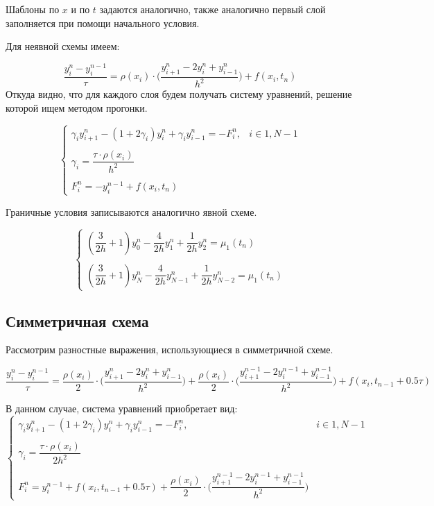 \documentclass[12pt]{article}
\begin{document}
Шаблоны по $x$ и по $t$ задаются аналогично, также аналогично первый слой заполняется при помощи начального условия.

Для неявной схемы имеем:

$$
\dfrac{y_i^n - y_i^{n-1}}{\tau} = \rho(x_i) \cdot \bigg(\dfrac{y_{i+1}^n - 2y_i^n + y_{i-1}^n}{h^2} \bigg) + f(x_i, t_n)
$$
Откуда видно, что для каждого слоя будем получать систему уравнений, решение которой ищем методом прогонки.

$$
\begin{cases}
\gamma_i y_{i+1}^n -(1 + 2\gamma_i) y_i^n + \gamma_i y_{i-1}^n = -F_i^n, & i \in {1, N-1} \\ \\
\gamma_i = \dfrac{\tau \cdot \rho(x_i)}{h^2} \\ \\
F_i^n = -y_i^{n-1} + f(x_i, t_n)
\end{cases}
$$

Граничные условия записываются аналогично явной схеме.

$$
\begin{cases}
(\dfrac{3}{2h} + 1)y_0^n - \dfrac{4}{2h}y_1^n + \dfrac{1}{2h}y_2^n = \mu_1(t_n) \\ \\
(\dfrac{3}{2h} + 1)y_N^n - \dfrac{4}{2h}y_{N-1}^n + \dfrac{1}{2h}y_{N-2}^n = \mu_1(t_n)
\end{cases} 
$$

\newpage
\subsection{Симметричная схема}

Рассмотрим разностные выражения, использующиеся в симметричной схеме.

$$
\dfrac{y_i^n - y_i^{n-1}}{\tau} = \dfrac{\rho(x_i)}{2} \cdot \bigg(\dfrac{y_{i+1}^n - 2y_i^n + y_{i-1}^n}{h^2} \bigg) + \dfrac{\rho(x_i)}{2} \cdot \bigg(\dfrac{y_{i+1}^{n-1}- 2y_i^{n-1} + y_{i-1}^{n-1}}{h^2} \bigg) + f(x_i, t_{n-1} + 0.5\tau)
$$

В данном случае, система уравнений приобретает вид:
$$
\begin{cases}
\gamma_i y_{i+1}^n -(1 + 2\gamma_i) y_i^n + \gamma_i y_{i-1}^n = -F_i^n, & i \in {1, N-1} \\ \\
\gamma_i = \dfrac{\tau \cdot \rho(x_i)}{2h^2} \\ \\
F_i^n = y_i^{n-1} + f(x_i, t_{n-1} + 0.5\tau) + \dfrac{\rho(x_i)}{2} \cdot \bigg(\dfrac{y_{i+1}^{n-1}- 2y_i^{n-1} + y_{i-1}^{n-1}}{h^2} \bigg)
\end{cases}
$$
\end{document}
